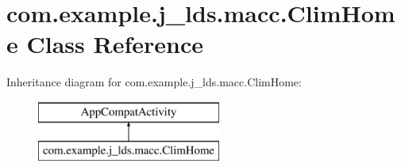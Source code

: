 \hypertarget{classcom_1_1example_1_1j__lds_1_1macc_1_1_clim_home}{}\section{com.\+example.\+j\+\_\+lds.\+macc.\+Clim\+Home Class Reference}
\label{classcom_1_1example_1_1j__lds_1_1macc_1_1_clim_home}
Inheritance diagram for com.\+example.\+j\+\_\+lds.\+macc.\+Clim\+Home\+:\begin{figure}[H]
\begin{center}
\leavevmode
\includegraphics[height=2.000000cm]{classcom_1_1example_1_1j__lds_1_1macc_1_1_clim_home}
\end{center}
\end{figure}
